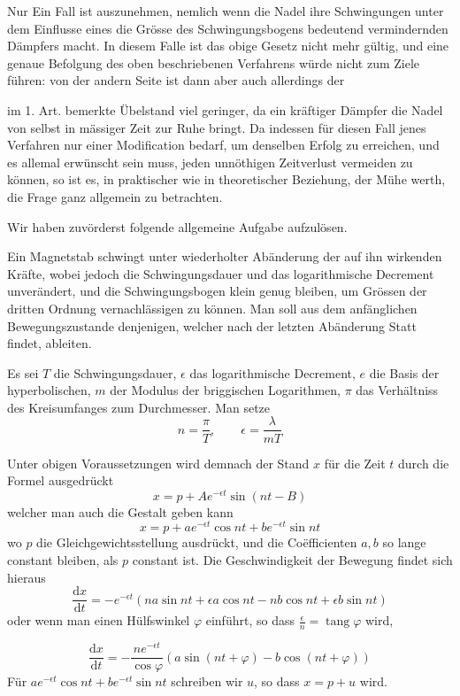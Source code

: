 Nur Ein Fall ist auszunehmen, nemlich wenn die Nadel ihre Schwingungen unter dem Einflusse eines die Grösse des Schwingungsbogens bedeutend vermindernden Dämpfers macht. In diesem Falle ist das obige Gesetz nicht mehr gültig, und eine genaue Befolgung des oben beschriebenen Verfahrens würde nicht zum Ziele führen: von der andern Seite ist dann aber auch allerdings der
\par\clearpage
{}
\noindent im 1. Art. bemerkte Übelstand viel geringer, da ein kräftiger Dämpfer die Nadel von selbst in mässiger Zeit zur Ruhe bringt. Da indessen für diesen Fall jenes Verfahren nur einer Modification bedarf, um denselben Erfolg zu erreichen, und es allemal erwünscht sein muss, jeden unnöthigen Zeitverlust vermeiden zu können, so ist es, in praktischer wie in theoretischer Beziehung, der Mühe werth, die Frage ganz allgemein zu betrachten.

Wir haben zuvörderst folgende allgemeine Aufgabe aufzulösen.

Ein Magnetstab schwingt unter wiederholter Abänderung der auf ihn wirkenden Kräfte, wobei jedoch die Schwingungsdauer und das logarithmische Decrement unverändert, und die Schwingungsbogen klein genug bleiben, um Grössen der dritten Ordnung vernachlässigen zu können. Man soll aus dem anfänglichen Bewegungszustande denjenigen, welcher nach der letzten Abänderung Statt findet, ableiten.

Es sei $T$ die Schwingungsdauer, $\epsilon$ das logarithmische Decrement, $e$ die Basis der hyperbolischen, $m$ der Modulus der briggischen Logarithmen, $\pi$ das Verhältniss des Kreisumfanges zum Durchmesser. Man setze
\[
n=\frac{\pi}{T},\qquad \epsilon=\frac{\lambda}{mT}
\]

Unter obigen Voraussetzungen wird demnach der Stand $x$ für die Zeit $t$ durch die Formel ausgedrückt
\[
x=p+Ae^{-\epsilon t}\sin(nt-B)
\]
welcher man auch die Gestalt geben kann
\[
x=p+ae^{-\epsilon t}\cos nt+be^{-\epsilon t}\sin nt
\]
wo $p$ die Gleichgewichtsstellung ausdrückt, und die Coëfficienten $a,b$ so lange constant bleiben, als $p$ constant ist. Die Geschwindigkeit der Bewegung findet sich hieraus
\[
\frac{\mathrm{d}x}{\mathrm{d}t}=-e^{-\epsilon t}(na\sin nt+\epsilon a\cos nt-nb\cos nt+\epsilon b\sin nt)
\]
oder wenn man einen Hülfswinkel $\varphi$ einführt, so dass $\frac{\epsilon}{n}=\operatorname{tang}\varphi$ wird,
\par\clearpage
{}
\[
\frac{\mathrm{d}x}{\mathrm{d}t}=-\frac{ne^{-\epsilon t}}{\cos\varphi}(a\sin(nt+\varphi)-b\cos(nt+\varphi))
\]
Für $ae^{-\epsilon t}\cos nt+be^{-\epsilon t}\sin nt$ schreiben wir $u$, so dass $x=p+u$ wird.

